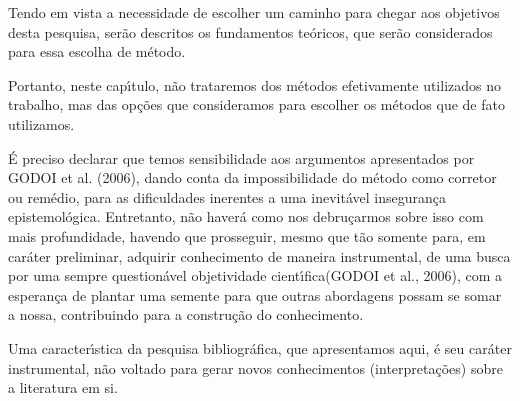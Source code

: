 \documentclass[
12pt,		%
openright,	%
twoside,  %
a4paper,			%
chapter=TITLE,		%
english,			%
french,				%
spanish,			%
brazil				%
]{USPSC-classe/USPSC}
\begin{document}
Tendo em vista a necessidade de escolher um caminho para chegar  aos objetivos desta pesquisa, ser\~ao descritos os fundamentos te\'oricos, que ser\~ao considerados para essa escolha de m\'etodo.

















Portanto, neste cap\'{\i}tulo, n\~ao trataremos dos m\'etodos efetivamente utilizados no trabalho, mas das op\c{c}\~oes que consideramos para escolher os m\'etodos que de fato utilizamos.

















\'E preciso declarar que temos sensibilidade aos argumentos apresentados por GODOI et al. (2006), dando conta da impossibilidade \textquotedbl  do m\'etodo como corretor ou rem\'edio, para as dificuldades \textquotedbl  inerentes a uma inevit\'avel inseguran\c{c}a epistemol\'ogica\textquotedbl . Entretanto, n\~ao haver\'a como nos debru\c{c}armos sobre isso com mais profundidade, havendo que prosseguir, mesmo que t\~ao somente para, em car\'ater preliminar, \textquotedbl adquirir conhecimento de maneira instrumental\textquotedbl , de uma busca por uma sempre question\'avel \textquotedbl objetividade cient\'{\i}fica\textquotedbl  (GODOI et al., 2006), com a esperan\c{c}a de plantar uma semente para que outras abordagens possam se somar a nossa, contribuindo para a constru\c{c}\~ao do conhecimento.

















Uma caracter\'{\i}stica da pesquisa bibliogr\'afica, que apresentamos aqui, \'e seu  car\'ater instrumental, n\~ao voltado para gerar novos conhecimentos (interpreta\c{c}\~oes) sobre a literatura em si.
\end{document}
